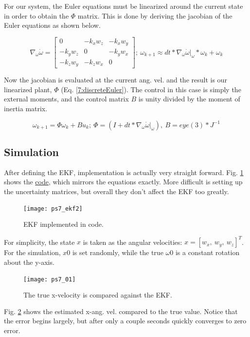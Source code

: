 \documentclass[12pt, letterpaper]{article}
\begin{document}
For our system, the Euler equations must be linearized around the current state in order to obtain the $\Phi$ matrix. This is done by deriving the jacobian of the Euler equations as shown below.

\[
\nabla_\omega \dot{\omega} =
\begin{bmatrix}
0 &-k_xw_z &-k_xw_y \\
-k_yw_z &0 &-k_yw_x \\
-k_zw_y &-k_zw_x &0 
\end{bmatrix}
;\ \omega_{k+1} \approx dt*\nabla_\omega \dot{\omega}|_\omega*\omega_k + \omega_k
\]

Now the jacobian is evaluated at the current ang. vel. and the result is our linearized plant, $\Phi$ (Eq. \ref{7:discreteEuler}). The control in this case is simply the external moments, and the control matrix $B$ is unity divided by the moment of inertia matrix.

\begin{equation}
\omega_{k+1} = \Phi \omega_k + B u_k;\ \Phi = (I+dt*\nabla_\omega \dot{\omega}|_\omega),\ B = eye(3)*J^{-1}
\label{7:discreteEuler}
\end{equation}

\subsection{Simulation}

After defining the EKF, implementation is actually very straight forward. Fig. \ref{7:ekf3} shows the \href{https://github.com/buckleytoby/aa279c_github/blob/master/src/EKF.m}{code}, which mirrors the equations exactly. More difficult is setting up the uncertainty matrices, but overall they don't affect the EKF too greatly. 

\begin{figure}[H]
	\centering
	\texttt{[image: ps7\_ekf2]}
	\caption{EKF implemented in code.}
	\label{7:ekf3}
\end{figure}

For simplicity, the state $x$ is taken as the angular velocities: $x=[w_x,\ w_y,\ w_z]^T$. For the simulation, $x0$ is set randomly, while the true $\omega0$ is a constant rotation about the y-axis.

\begin{figure}[H]
	\centering
	\texttt{[image: ps7\_01]}
	\caption{The true x-velocity is compared against the EKF.}
	\label{7:ekfx}
\end{figure}

Fig. \ref{7:ekfx} shows the estimated x-ang. vel. compared to the true value. Notice that the error begins largely, but after only a couple seconds quickly converges to zero error.
\end{document}
